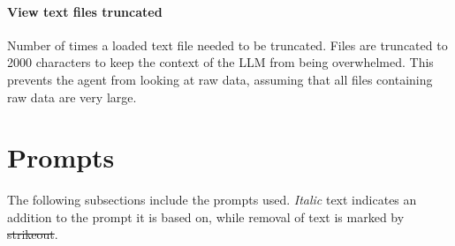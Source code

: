 \documentclass[submission, Phys]{SciPost}
\begin{document}
\paragraph{View text files truncated}  Number of times a loaded text file needed to be truncated. Files are truncated to 2000 characters to keep the context of the LLM from being overwhelmed. This prevents the agent from looking at raw data, assuming that all files containing raw data are very large.



\section{Prompts}
\label{app:prompts}
The following subsections include the prompts used. \textit{Italic} text indicates an addition to the prompt it is based on, while removal of text is marked by  \sout{strikeout}.
\end{document}
